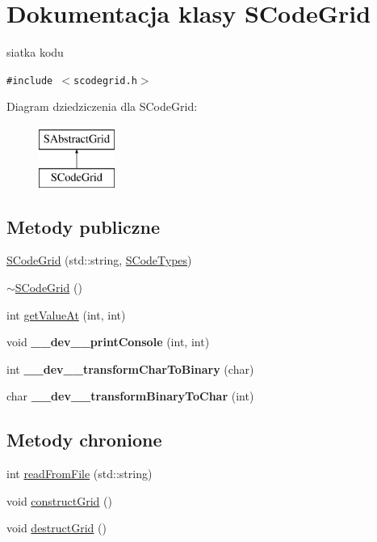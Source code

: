 \hypertarget{classSCodeGrid}{
\section{Dokumentacja klasy SCodeGrid}
\label{classSCodeGrid}
}
siatka kodu  


{\tt \#include $<$scodegrid.h$>$}

Diagram dziedziczenia dla SCodeGrid:\begin{figure}[H]
\begin{center}
\leavevmode
\includegraphics[height=2cm]{classSCodeGrid}
\end{center}
\end{figure}
\subsection*{Metody publiczne}
\begin{CompactItemize}
\item 
\hyperlink{classSCodeGrid_e430762ac9855cd60f8d5a57c46428b9}{SCodeGrid} (std::string, \hyperlink{senums_8h_1a2ae45552936d27425f99e1c187b043}{SCodeTypes})
\item 
\hyperlink{classSCodeGrid_c150afdd8f27785b5ddf5669a4d90332}{$\sim$SCodeGrid} ()
\item 
int \hyperlink{classSCodeGrid_c57d52a49a55c91068fe0eb541e721f8}{getValueAt} (int, int)
\item 
\hypertarget{classSCodeGrid_c01feeae87539b97aed07d67b975f174}{
void \textbf{\_\-\_\-dev\_\-\_\-printConsole} (int, int)}
\label{classSCodeGrid_c01feeae87539b97aed07d67b975f174}

\item 
\hypertarget{classSCodeGrid_c5754181e1266e23935d84f3beeb5979}{
int \textbf{\_\-\_\-dev\_\-\_\-transformCharToBinary} (char)}
\label{classSCodeGrid_c5754181e1266e23935d84f3beeb5979}

\item 
\hypertarget{classSCodeGrid_75d1d340ee3c5704527e793f2e71e93b}{
char \textbf{\_\-\_\-dev\_\-\_\-transformBinaryToChar} (int)}
\label{classSCodeGrid_75d1d340ee3c5704527e793f2e71e93b}

\end{CompactItemize}
\subsection*{Metody chronione}
\begin{CompactItemize}
\item 
int \hyperlink{classSCodeGrid_46ed88ad7346788efb14c40cbd836981}{readFromFile} (std::string)
\item 
void \hyperlink{classSCodeGrid_f15ba156433f88a40887e5ba72d9201a}{constructGrid} ()
\item 
void \hyperlink{classSCodeGrid_6bd4c1bf841bd09c2ffb2e019c08b4ed}{destructGrid} ()
\end{CompactItemize}
